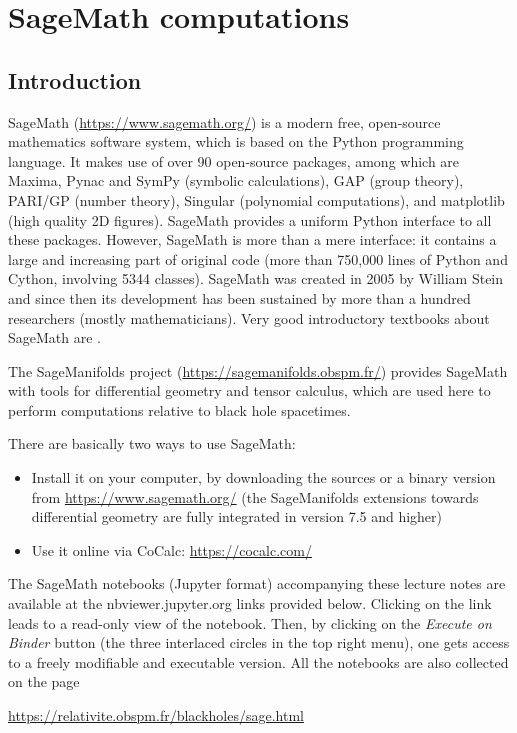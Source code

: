 \chapter{SageMath computations} \label{s:sam}

\minitoc

\section{Introduction}


\textsf{SageMath} (\url{https://www.sagemath.org/}) is a modern free,
open-source mathematics software system, which is
based on the Python programming language. It makes use of over 90 open-source packages,
among which are \textsf{Maxima}, \textsf{Pynac} and \textsf{SymPy} (symbolic calculations),
\textsf{GAP} (group theory),
\textsf{PARI/GP} (number theory), \textsf{Singular} (polynomial computations),
and \textsf{matplotlib} (high quality 2D figures).
\textsf{SageMath} provides a uniform Python interface to all these packages. However,
\textsf{SageMath} is more than a mere interface: it contains a large and increasing part of
original code (more than 750,000 lines of Python and Cython, involving 5344 classes).
\textsf{SageMath} was created in 2005 by William Stein \cite{SteinJ05} and since
then its development has been sustained by more than a hundred researchers
(mostly mathematicians). Very good introductory textbooks about \textsf{SageMath} are
\cite{Zimme18,JoyneS14,Bard15}.

The \textsf{SageManifolds} project (\url{https://sagemanifolds.obspm.fr/})
provides \textsf{SageMath} with tools for differential geometry and tensor calculus,
which are used here to perform computations relative to black hole spacetimes.


There are basically two ways to use \textsf{SageMath}:
\begin{itemize}
\item Install it on your computer, by downloading the sources or a binary version
from \url{https://www.sagemath.org/} (the \textsf{SageManifolds} extensions towards
differential geometry are fully integrated in version 7.5 and higher)
\item Use it online via \textsf{CoCalc}: \url{https://cocalc.com/}
\end{itemize}


The SageMath notebooks (Jupyter format) accompanying these lecture notes are available
at the \textsf{nbviewer.jupyter.org} links provided below.
Clicking on the link leads to a read-only view of the notebook. Then,
by clicking on the \emph{Execute on Binder} button (the three interlaced circles
in the top right menu), one gets access to a freely modifiable and executable version.
All the notebooks are also collected on the page
\begin{center}
\url{https://relativite.obspm.fr/blackholes/sage.html}
\end{center}

